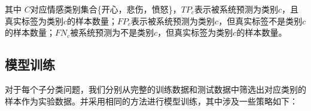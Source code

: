 其中 $C$对应情感类别集合\{开心，悲伤，愤怒\}，$TP_c$表示被系统预测为类别$c$，且真实标签为类别$c$的样本数量；$FP_c$表示被系统预测为类别$c$，但真实标签不是类别$c$的样本数量；$FN_c$被系统预测为不是类别$c$，但真实标签为类别$c$的样本数量。 






\subsection{模型训练}
\label{ssec:exp_context_emo_model_training}

对于每个子分类问题，我们分别从完整的训练数据和测试数据中筛选出对应类别的样本作为实验数据。并采用相同的方法进行模型训练，其中涉及一些策略如下：

